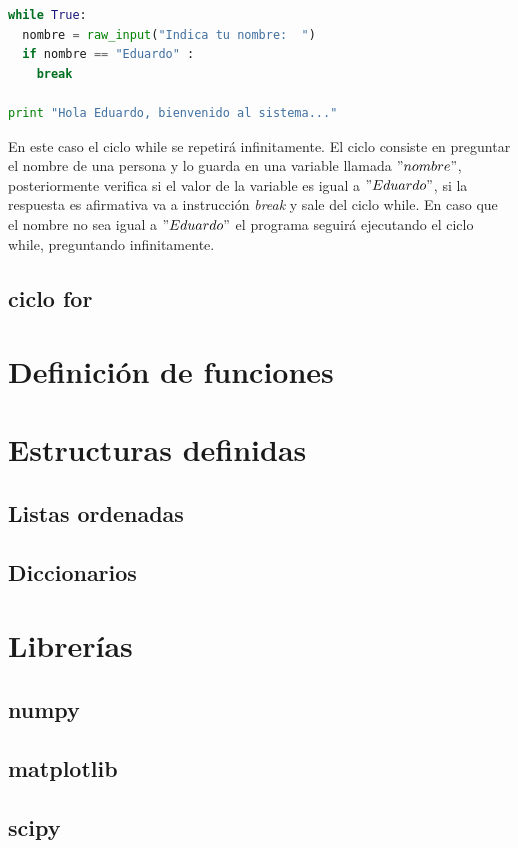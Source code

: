 \documentclass[a4paper, openright, 12pt]{article}
\begin{document}
\begin{lstlisting}[language=Python]
while True:
  nombre = raw_input("Indica tu nombre:  ")
  if nombre == "Eduardo" :
    break

print "Hola Eduardo, bienvenido al sistema..."
\end{lstlisting}    

    En este caso el ciclo while se repetirá infinitamente. El ciclo consiste en preguntar el nombre de una persona y lo guarda en una variable llamada $"nombre"$, posteriormente verifica si el valor de la variable es igual a $"Eduardo"$, si la respuesta es afirmativa va a instrucción \textit{break} y sale del ciclo while. En caso que el nombre no sea igual a $"Eduardo"$ el programa seguirá ejecutando el ciclo while, preguntando infinitamente.\\ 


    \subsection{ciclo for}

    \newpage{}

  \section{Definición de funciones}

    \newpage{}


  \section{Estructuras definidas}
    \subsection{Listas ordenadas}
    \subsection{Diccionarios}

    \newpage{}


  \section{Librerías}
    \subsection{numpy}
    \subsection{matplotlib}
    \subsection{scipy}
\end{document}
